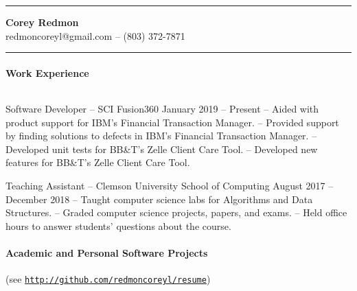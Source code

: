 \documentclass{article}
\begin{document}
  \hrule height 1pt
  \vspace{0.05in}
  \begin{center}
    {\Large \textbf{Corey Redmon}}\\
    redmoncoreyl@gmail.com -- (803) 372-7871
  \end{center}
  \vspace{0.1in}
  \hrule height 1pt

  \setlength{\parskip}{0.1in}
  \setlength{\parindent}{0.4in}

  \setlength{\parskip}{0.0in}
  \paragraph{Work Experience} $ $
  \setlength{\parskip}{0.1in}

  \hangindent=0.8in
  Software Developer -- SCI Fusion360 \hfill January 2019 -- Present \newline
  -- Aided with product support for IBM's Financial Transaction Manager. \newline
  -- Provided support by finding solutions to defects in IBM's Financial Transaction Manager. \newline
  -- Developed unit tests for BB\&T's Zelle Client Care Tool. \newline
  -- Developed new features for BB\&T's Zelle Client Care Tool.

  \hangindent=0.8in
  Teaching Assistant -- Clemson University School of Computing \hfill August 2017 -- December 2018 \newline
  -- Taught computer science labs for Algorithms and Data Structures. \newline
  -- Graded computer science projects, papers, and exams. \newline
  -- Held office hours to answer students' questions about the course.

  \setlength{\parskip}{0.0in}
  \paragraph{Academic and Personal Software Projects} \hfill (see \href{http://github.com/redmoncoreyl/resume}{\texttt{http://github.com/redmoncoreyl/resume}})%
  \setlength{\parskip}{0.1in}
\end{document}
